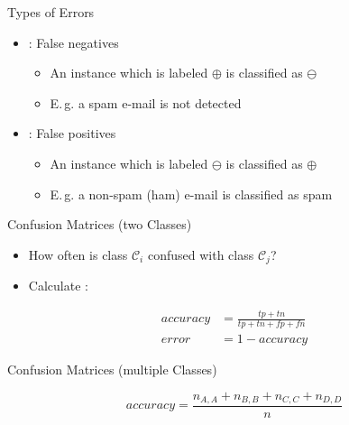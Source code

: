 \begin{frame}{Types of Errors}{}
	\begin{itemize}
		\item {}: False negatives
		\begin{itemize}
			\item An instance which is labeled $\oplus$ is classified as $\ominus$
			\item E.\,g. a spam e-mail is not detected
		\end{itemize}
		\item {}: False positives
		\begin{itemize}
			\item An instance which is labeled $\ominus$ is classified as $\oplus$
			\item E.\,g. a non-spam (ham) e-mail is classified as spam
		\end{itemize}
	\end{itemize}
	
	\vspace*{2mm}
	\begin{boxBlueNoFrame}
	\end{boxBlueNoFrame}
\end{frame}


\begin{frame}{Confusion Matrices (two Classes)}{}\important
	\vspace*{2mm}
	\begin{itemize}
		\item How often is class $\mathcal{C}_i$ confused with class $\mathcal{C}_j$?
		\item Calculate :
	\end{itemize}
	
	\vspace*{-5mm}
	\begin{align*}
		accuracy 	&= \frac{tp + tn}{tp + tn + fp + fn} \\[3mm]
		error		&= 1 - accuracy
	\end{align*}
\end{frame}


\begin{frame}{Confusion Matrices (multiple Classes)}{}
	
	
	\vspace*{2mm}
	\begin{equation*}
		accuracy = \frac{n_{A,A} + n_{B,B} + n_{C,C} + n_{D,D}}{n}
	\end{equation*}
\end{frame}


